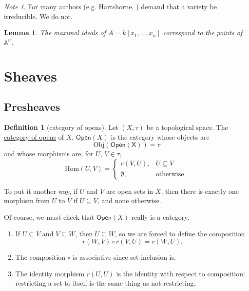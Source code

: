 \documentclass[a4paper,10pt]{scrreprt}
\newcommand{\defn}[1]{\ul{#1}}
\newcommand{\Obj}{\mathrm{Obj}}
\newcommand{\Hom}{\mathrm{Hom}}
\theoremstyle{definition}
\newtheorem{definition}{Definition}[section]
\theoremstyle{plain}
\newtheorem{lemma}{Lemma}[section]
\theoremstyle{remark}
\newtheorem{note}{Note}[section]
\begin{document}
\begin{note}
  For many authors (e.g. Hartshorne, \cite{hartshorne-algebraic-geometry}) demand that a variety be irreducible. We do not.
\end{note}

\begin{lemma}
  The maximal ideals of $A = k[x_{1}, \ldots, x_{n}]$ correspond to the points of $\mathbb{A}^{n}$.
\end{lemma}

\section{Sheaves}
\subsection{Presheaves}

\begin{definition}[category of opens] 
  \label{def:opencategory} 
  Let $(X, \tau)$ be a topological space. The \defn{category of opens} of $X$, $\mathsf{Open}(X)$ is the category whose objects are 
  \begin{equation*}
    \Obj(\mathsf{Open(X)}) = \tau 
  \end{equation*} and whose morphisms are, for $U$, $V \in \tau$, 
  \begin{equation*} 
    \Hom(U,V) =
    \begin{cases} 
      r(V,U), & U \subseteq V \\ 
      \emptyset, & \text{otherwise}.  
    \end{cases} 
  \end{equation*}

  To put it another way, if $U$ and $V$ are open sets in $X$, then there is exactly one morphism from $U$ to $V$ if $U \subseteq V$, and none otherwise.
\end{definition}

Of course, we must check that $\mathsf{Open}(X)$ really is a category.
\begin{enumerate} 
  \item If $U \subseteq V$ and $V \subseteq W$, then $U \subseteq W$, so we are forced to define the composition 
    \begin{equation*} 
      r(W,V) \circ r(V,U) = r(W,U).  
    \end{equation*} 
  \item The composition $\circ$ is associative since set inclusion is.

  \item The identity morphism $r(U,U)$ is the identity with respect to composition: restricting a set to itself is the same thing as not restricting.  
\end{enumerate}
\end{document}
